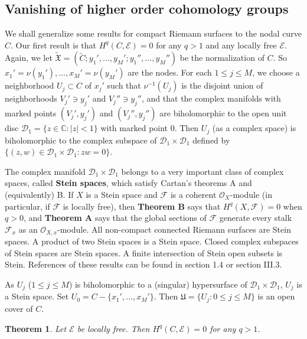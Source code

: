 \documentclass[12pt,a4paper,notitlepage]{report}
\theoremstyle{definition}
\theoremstyle{plain}
\newtheorem{thm}[df]{Theorem}
\newcommand{\fk}{\mathfrak}
\newcommand{\mc}{\mathcal}
\newcommand{\wtd}{\widetilde}
\newcommand{\scr}{\mathscr}
\numberwithin{equation}{section}
\begin{document}
\subsection*{Vanishing of higher order cohomology groups}

We shall generalize some results for compact Riemann surfaces to the nodal curve $C$. Our first result is that $H^q(C,\scr E)=0$ for any $q>1$ and any locally free $\scr E$. Again, we let $\wtd{\fk X}=(\wtd C;y_1',\dots,y_M';y_1'',\dots,y_M'')$ be the normalization of $C$. So $x_1'=\nu(y_1'),\dots,x_M'=\nu(y_M')$ are the nodes. For each $1\leq j\leq M$, we choose a neighborhood $U_j\subset C$ of $x_j'$ such that $\nu^{-1}(U_j)$ is the disjoint union of neighborhoods $V_j'\ni y_j'$ and $V_j''\ni y_j''$, and that the complex manifolds with marked points $(V_j',y_j')$ and $(V_j'',y_j'')$ are biholomorphic to the open unit disc $\mc D_1=\{z\in\mathbb C:|z|<1 \}$ with marked point $0$. Then $U_j$ (as a complex space) is biholomorphic to the complex subspace of $\mc D_1\times \mc D_1$ defined by $\{(z,w)\in \mc D_1\times \mc D_1:zw=0\}$. 

The complex manifold $\mc D_1\times \mc D_1$ belongs to a very important class of complex spaces, called \textbf{Stein spaces}, which satisfy Cartan's theorems A and (equivalently) B. If $X$ is a Stein space and $\scr F$ is a coherent $\scr O_X$-module (in particular, if $\scr F$ is  locally free), then \textbf{Theorem B} says that $H^q(X,\scr F)=0$ when $q>0$, and \textbf{Theorem A} says that the global sections of $\scr F$ generate every stalk $\scr F_x$ as an $\scr O_{X,x}$-module.  All non-compact connected Riemann surfaces are Stein spaces. A  product  of two Stein spaces is a Stein space. Closed complex subspaces of Stein spaces are Stein spaces. A finite intersection of Stein open subsets is Stein. References of these results can be found in \cite{GR84} section 1.4 or \cite{GPR94} section III.3. 

As $U_j$ ($1\leq j\leq M$) is biholomorphic to a (singular) hypersurface of $\mc D_1\times \mc D_1$, $U_j$ is a Stein space. Set $U_0=C-\{x_1',\dots,x_M'\}$. Then $\fk U=\{U_j:0\leq j\leq M \}$ is an open cover of $C$.

\begin{thm}\label{lb7}
Let $\scr E$ be locally free. Then $H^q(C,\scr E)=0$ for any $q>1$.
\end{thm}
\end{document}
